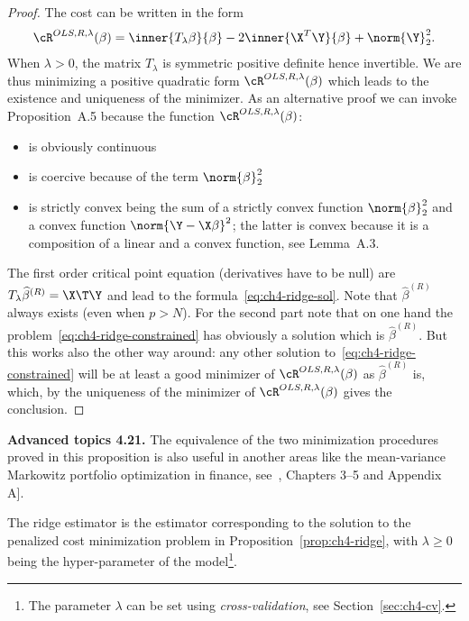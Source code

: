 \begin{proof}
The cost can be written in the form
\begin{equation}\label{eq:ch4-ridge-expanded}
\cR^{OLS, R, \lambda}(\beta) = \inner{T_\lambda \beta}{\beta} - 2 \inner{\X^T \Y}{\beta} + \norm{\Y}_2^2.
\end{equation}
When $\lambda > 0$, the matrix $T_\lambda$ is symmetric positive definite hence invertible.
We are thus minimizing a positive quadratic form $\cR^{OLS, R, \lambda}(\beta)$ which leads
to the existence and uniqueness of the minimizer.
As an alternative proof we can invoke Proposition~A.5 because the function
$\cR^{OLS, R, \lambda}(\beta)$:
\begin{itemize}
\item is obviously continuous
\item is coercive because of the term $\norm{\beta}_2^2$
\item is strictly convex being the sum of a strictly convex function $\norm{\beta}_2^2$ and a
convex function $\norm{\Y - \X \beta}^2$; the latter is convex because it is a composition
of a linear and a convex function, see Lemma~A.3.
\end{itemize}
The first order critical point equation (derivatives have to be null) are
$T_\lambda \widehat{\beta}^{(R)} = \X\T \Y$ and lead to the formula~\eqref{eq:ch4-ridge-sol}. Note that $\widehat{\beta}^{(R)}$ always
exists (even when $p > N$).
For the second part note that on one hand the problem~\eqref{eq:ch4-ridge-constrained} has obviously
a solution which is $\widehat{\beta}^{(R)}$. But this works also the other way around: any
other solution to~\eqref{eq:ch4-ridge-constrained} will be at least a good minimizer of $\cR^{OLS, R, \lambda}(\beta)$
as $\widehat{\beta}^{(R)}$ is, which, by the uniqueness of the minimizer of $\cR^{OLS, R, \lambda}(\beta)$ gives
the conclusion.
\end{proof}

\begin{tcolorbox}[advancedbox]
\textbf{Advanced topics 4.21.} The equivalence of the two minimization procedures proved in this proposition is also useful in another areas like
the mean-variance Markowitz portfolio optimization in finance, see~\cite{turinici4},
Chapters 3--5 and Appendix A].
\end{tcolorbox}

\begin{definition}
The ridge estimator is the estimator corresponding to the solution to the penalized cost minimization problem in Proposition~\ref{prop:ch4-ridge}, with $\lambda \ge 0$ being the hyper-parameter of the model\footnote{The parameter $\lambda$ can be set using \emph{cross-validation}, see Section~\ref{sec:ch4-cv}.}.
\end{definition}

